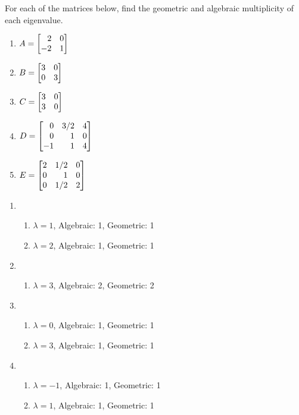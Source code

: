 \begin{exercises}
	\begin{problist}
		\prob For each of the matrices below, find the geometric and algebraic multiplicity of
		each eigenvalue. \label{PROBMOD16-matrices}
		\begin{enumerate}
			\item   $A=\mat{2&0\\-2&1}$
			\item   $B=\mat{3&0\\0&3}$
			\item   $C=\mat{3&0\\3&0}$
			\item   $D=\mat{0&3/2&4\\0&1&0\\-1&1&4}$
			\item   $E=\mat{2&1/2&0\\0&1&0\\0&1/2&2}$
		\end{enumerate}
		\begin{solution}
		    \begin{enumerate}
		        \item 
		            \begin{enumerate}
		                \item $\lambda=1$, Algebraic: 1, Geometric: 1 
		                \item $\lambda=2$, Algebraic: 1, Geometric: 1 
		            \end{enumerate}
		        \item 
		            \begin{enumerate}
		                \item $\lambda=3$, Algebraic: 2, Geometric: 2 
		            \end{enumerate}
		        \item 
		            \begin{enumerate}
		                \item $\lambda=0$, Algebraic: 1, Geometric: 1 
		                \item $\lambda=3$, Algebraic: 1, Geometric: 1 
		            \end{enumerate}
		        \item 
		            \begin{enumerate}
		                \item $\lambda=-1$, Algebraic: 1, Geometric: 1 
		                \item $\lambda=1$, Algebraic: 1, Geometric: 1 

\end{enumerate}
\end{enumerate}
\end{solution}
\end{problist}
\end{exercises}
